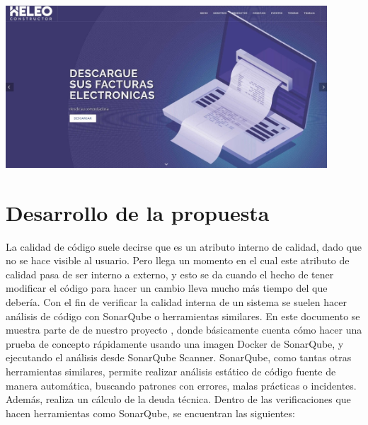 \documentclass[preprint,12pt]{elsarticle}
\begin{document}
\begin{itemize}
	\begin{center}
	\includegraphics[width=12cm]{./imagen/3} 
	\end{center}
\end{itemize}

\section{Desarrollo de la propuesta}
La calidad de código suele decirse que es un atributo interno de calidad, dado que no se hace visible al usuario. Pero llega un momento en el cual este atributo de calidad pasa de ser interno a externo, y esto se da cuando el hecho de tener modificar el código para hacer un cambio lleva mucho más tiempo del que debería. Con el fin de verificar la calidad interna de un sistema se suelen hacer análisis de código con SonarQube o herramientas similares. En este documento se muestra parte de de nuestro proyecto , donde básicamente  cuenta cómo hacer una prueba de concepto rápidamente usando una imagen Docker de SonarQube, y ejecutando el análisis desde SonarQube Scanner.
SonarQube, como tantas otras herramientas similares, permite realizar análisis estático de código fuente de manera automática, buscando patrones con errores, malas prácticas o incidentes. Además, realiza un cálculo de la deuda técnica. Dentro de las verificaciones que hacen herramientas como SonarQube, se encuentran las siguientes:
\end{document}

